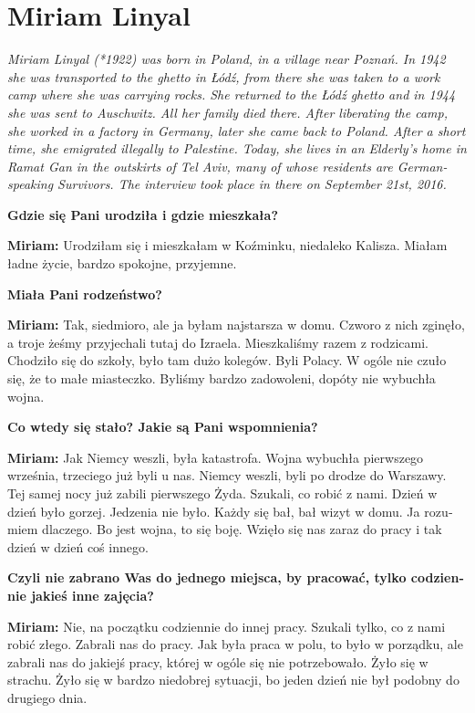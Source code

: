 \section{Miriam Linyal}
\begin{otherlanguage}{ngerman}
\textit{Miriam Linyal (*1922) was born in Poland, in a village near Poznań. In 1942 she was transported to the ghetto in Łódź, from there she was taken to a work camp where she was carrying rocks. She returned to the Łódź ghetto and in 1944 she was sent to Auschwitz. All her family died there. After liberating the camp, she worked in a factory in Germany, later she came back to Poland. After a short time, she emigrated illegally to Palestine. Today, she lives in an Elderly’s home in Ramat Gan in the outskirts of Tel Aviv, many of whose residents are German-speaking Survivors. The interview took place in there on September 21st, 2016.}\par
\vspace*{2em}
\textbf{Gdzie się Pani urodziła i gdzie mieszkała?} 

\textbf{Miriam:} Urodziłam się i mieszkałam w Koźminku, niedaleko Kalisza. Miałam ładne życie, bardzo spokojne, przyjemne.

\textbf{Miała Pani rodzeństwo?} 

\textbf{Miriam:} Tak, siedmioro, ale ja byłam najstarsza w domu. Czworo z nich zginęło, a troje żeśmy przyjechali tutaj do Izraela. Mieszkaliśmy razem z rodzicami. Chodziło się do szkoły, było tam dużo kolegów. Byli Polacy. W ogóle nie czuło się, że to małe miasteczko. Byliśmy bardzo zadowoleni, dopóty nie wybuchła wojna.

\textbf{ Co wtedy się stało? Jakie są Pani wspomnienia?} 

\textbf{Miriam:} Jak Niemcy weszli, była katastrofa. Wojna wybuchła pierwszego września, trzeciego już byli u nas. Niemcy weszli, byli po drodze do Warszawy. Tej samej nocy już zabili pierwszego Żyda. Szukali, co robić z nami. Dzień w dzień było gorzej. Jedzenia nie było. Każdy się bał, bał wizyt w domu. Ja rozumiem dlaczego. Bo jest wojna, to się boję. Wzięło się nas zaraz do pracy i tak dzień w dzień coś innego.

\textbf{Czyli nie zabrano Was do jednego miejsca, by pracować, tylko codziennie jakieś inne zajęcia?} 

\textbf{Miriam:} Nie, na początku codziennie do innej pracy. Szukali tylko, co z nami robić złego. Zabrali nas do pracy. Jak była praca w polu, to było w porządku, ale zabrali nas do jakiejś pracy, której w ogóle się nie potrzebowało. Żyło się w strachu. Żyło się w bardzo niedobrej sytuacji, bo jeden dzień nie był podobny do drugiego dnia. 


\end{otherlanguage}
